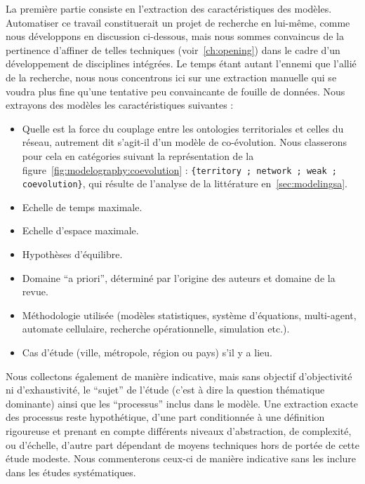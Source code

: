 La première partie consiste en l'extraction des caractéristiques des modèles. Automatiser ce travail constituerait un projet de recherche en lui-même, comme nous développons en discussion ci-dessous, mais nous sommes convaincus de la pertinence d'affiner de telles techniques (voir~\ref{ch:opening}) dans le cadre d'un développement de disciplines intégrées. Le temps étant autant l'ennemi que l'allié de la recherche, nous nous concentrons ici sur une extraction manuelle qui se voudra plus fine qu'une tentative peu convaincante de fouille de données. Nous extrayons des modèles les caractéristiques suivantes :

\begin{itemize}
\item Quelle est la force du couplage entre les ontologies territoriales et celles du réseau, autrement dit s'agit-il d'un modèle de co-évolution. Nous classerons pour cela en catégories suivant la représentation de la figure~\ref{fig:modelography:coevolution} : \texttt{\{territory ; network ; weak ; coevolution\}}, qui résulte de l'analyse de la littérature en~\ref{sec:modelingsa}.
\item Echelle de temps maximale. %
\item Echelle d'espace maximale. %
\item Hypothèses d'équilibre.
\item Domaine ``a priori'', déterminé par l'origine des auteurs et domaine de la revue.
\item Méthodologie utilisée (modèles statistiques, système d'équations, multi-agent, automate cellulaire, recherche opérationnelle, simulation etc.).
\item Cas d'étude (ville, métropole, région ou pays) s'il y a lieu.
\end{itemize}

Nous collectons également de manière indicative, mais sans objectif d'objectivité ni d'exhaustivité, le ``sujet'' de l'étude (c'est à dire la question thématique dominante) ainsi que les ``processus'' inclus dans le modèle. Une extraction exacte des processus reste hypothétique, d'une part conditionnée à une définition rigoureuse et prenant en compte différents niveaux d'abstraction, de complexité, ou d'échelle, d'autre part dépendant de moyens techniques hors de portée de cette étude modeste. Nous commenterons ceux-ci de manière indicative sans les inclure dans les études systématiques.


